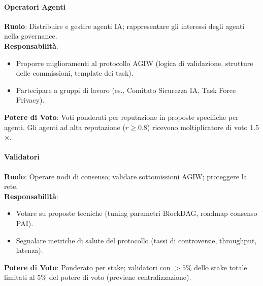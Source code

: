 \documentclass[11pt]{article}
\begin{document}
\begin{itemize}[noitemsep]
\paragraph{Operatori Agenti}
\textbf{Ruolo}: Distribuire e gestire agenti IA; rappresentare gli interessi degli agenti nella governance.\\
\textbf{Responsabilità}:
\begin{itemize}[noitemsep]
  \item Proporre miglioramenti al protocollo AGIW (logica di validazione, strutture delle commissioni, template dei task).
  \item Partecipare a gruppi di lavoro (es., Comitato Sicurezza IA, Task Force Privacy).
\end{itemize}
\textbf{Potere di Voto}: Voti ponderati per reputazione in proposte specifiche per agenti. Gli agenti ad alta reputazione ($r \geq 0.8$) ricevono moltiplicatore di voto 1.5$\times$.

\paragraph{Validatori}
\textbf{Ruolo}: Operare nodi di consenso; validare sottomissioni AGIW; proteggere la rete.\\
\textbf{Responsabilità}:
\begin{itemize}[noitemsep]
  \item Votare su proposte tecniche (tuning parametri BlockDAG, roadmap consenso PAI).
  \item Segnalare metriche di salute del protocollo (tassi di controversie, throughput, latenza).
\end{itemize}
\textbf{Potere di Voto}: Ponderato per stake; validatori con $>5\%$ dello stake totale limitati al 5\% del potere di voto (previene centralizzazione).


\end{itemize}
\end{document}
